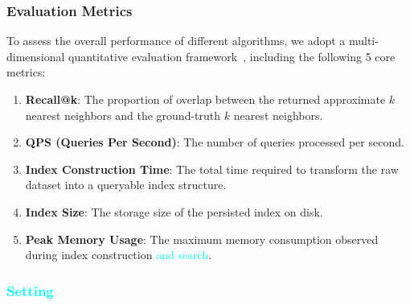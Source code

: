 \documentclass[sigconf, nonacm]{acmart}
\begin{document}
{	
	
	
	
	
	\subsubsection{Evaluation Metrics}
	
	To assess the overall performance of different algorithms, we adopt a multi-dimensional quantitative evaluation framework~\cite{compare}, including the following 5 core metrics:
	
	\begin{enumerate}
		
		\item \textbf{Recall@k}: The proportion of overlap between the returned approximate $k$ nearest neighbors and the ground-truth $k$ nearest neighbors.
		\item \textbf{QPS (Queries Per Second)}: The number of queries processed per second.
		\item \textbf{Index Construction Time}: The total time required to transform the raw dataset into a queryable index structure.
		\item \textbf{Index Size}: The storage size of the persisted index on disk.
		\item \textbf{Peak Memory Usage}: The maximum memory consumption observed during index construction \textcolor{cyan}{and search}.
	\end{enumerate}
	
	
	
	
	
	\subsubsection{\textcolor{cyan}{Setting}}
	
}
\end{document}
